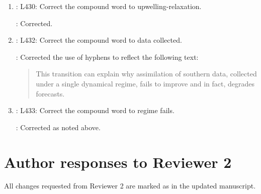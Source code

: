\documentclass[a4paper]{article}
\begin{document}
\begin{answers}
\begin{enumerate}
    \action: Panel references and x-axis labels are now fixed.

  \item \reply: L430: Correct the compound word to
    upwelling-relaxation.

    \action: Corrected. 
      
  \item \reply: L432: Correct the compound word to data collected.
    
    \action: Corrected the use of hyphens to reflect the following text:

    \begin{quote}

      This transition can explain why assimilation of southern data,
      collected under a single dynamical regime, fails to improve and
      in fact, degrades forecasts.

      \end{quote}

  \item \reply: L433: Correct the compound word to regime fails.

    \action: Corrected as noted above.

  \end{enumerate}
  
\end{answers}


\section*{Author responses to Reviewer 2}
All changes requested from Reviewer 2 are marked as  in
the updated manuscript.


\setcounter{reviewer}{2}
\end{document}
